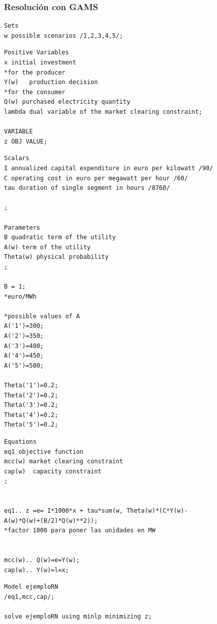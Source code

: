 \subsubsection{Resolución con GAMS}
\begin{footnotesize}

\begin{lstlisting}
Sets
w possible scenarios /1,2,3,4,5/;
\end{lstlisting}

\begin{lstlisting}
Positive Variables
x initial investment
*for the producer
Y(w)   production decision
*for the consumer
Q(w) purchased electricity quantity
lambda dual variable of the market clearing constraint;

VARIABLE
z OBJ VALUE;   
\end{lstlisting}

\begin{lstlisting}
Scalars
I annualized capital expenditure in euro per kilowatt /90/
C operating cost in euro per megawatt per hour /60/
tau duration of single segment in hours /8760/

;

Parameters
B quadratic term of the utility
A(w) term of the utility
Theta(w) physical probability
;

B = 1;
*euro/MWh 

*possible values of A
A('1')=300;
A('2')=350;
A('3')=400;
A('4')=450;
A('5')=500;

Theta('1')=0.2;
Theta('2')=0.2;
Theta('3')=0.2;
Theta('4')=0.2;
Theta('5')=0.2;
\end{lstlisting}

\begin{lstlisting}
Equations
eq1 objective function
mcc(w) market clearing constraint
cap(w)  capacity constraint
;


eq1.. z =e= I*1000*x + tau*sum(w, Theta(w)*(C*Y(w)-
A(w)*Q(w)+(B/2)*Q(w)**2));
*factor 1000 para poner las unidades en MW


mcc(w).. Q(w)=e=Y(w);
cap(w).. Y(w)=l=x;   
\end{lstlisting}

\begin{lstlisting}
Model ejemploRN
/eq1,mcc,cap/;

solve ejemploRN using minlp minimizing z;    
\end{lstlisting}
\end{footnotesize}

